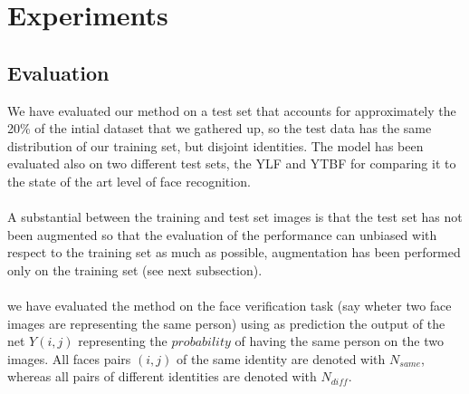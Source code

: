\section{Experiments}

\subsection{Evaluation}
We have evaluated our method on a test set that accounts for approximately the 20\% of the intial dataset that we gathered up, so the test data has the same distribution of our training set, but disjoint identities.
The model has been evaluated also on two different test sets, the YLF and YTBF for comparing it to the state of the art level of face recognition. 
\paragraph{}
A substantial between the training and test set images is that the test set has not been augmented so that the evaluation of the performance can unbiased with respect to the training set as much as possible, augmentation has been performed only on the training set (see next subsection).
\paragraph{}
we have evaluated the method on the face verification task (say wheter two face images are representing the same person) using as prediction the output of the net $Y(i,j)$ representing the $probability$ of having the same person on the two images. All faces pairs $(i,j)$ of the same identity are denoted with $N_{same}$, whereas all pairs of different identities are denoted with $N_{diff}$.\\
 
